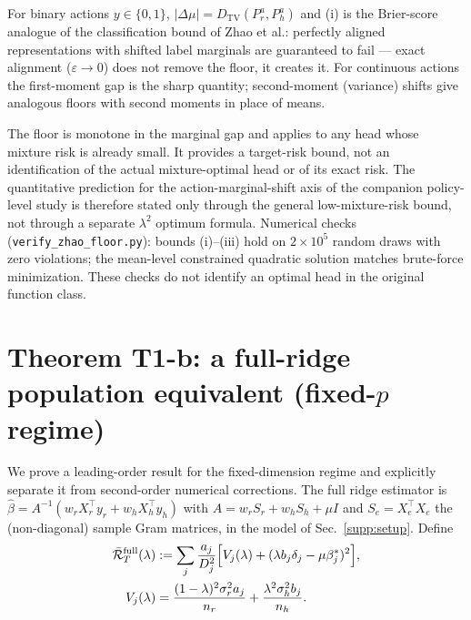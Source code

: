 \begin{remark}
For binary actions $y \in \{0,1\}$, $|\Delta\mu| = D_{\mathrm{TV}}(P_r^a, P_h^a)$ and (i) is the Brier-score analogue of the classification bound of Zhao et al.: perfectly aligned representations with shifted label marginals are guaranteed to fail --- exact alignment ($\varepsilon \to 0$) does not remove the floor, it creates it.
For continuous actions the first-moment gap is the sharp quantity; second-moment (variance) shifts give analogous floors with second moments in place of means.
\end{remark}

\begin{remark}
The floor is monotone in the marginal gap and applies to any head whose mixture risk is already small. It provides a target-risk bound, not an identification of the actual mixture-optimal head or of its exact risk.
The quantitative prediction for the action-marginal-shift axis of the companion policy-level study is therefore stated only through the general low-mixture-risk bound, not through a separate $\lambda^2$ optimum formula.
Numerical checks (\texttt{verify\_zhao\_floor.py}): bounds (i)--(iii) hold on $2\times10^5$ random draws with zero violations; the mean-level constrained quadratic solution matches brute-force minimization. These checks do not identify an optimal head in the original function class.
\end{remark}

\section{Theorem T1-b: a full-ridge population equivalent (fixed-$p$ regime)}
\label{supp:t1b}

We prove a leading-order result for the fixed-dimension regime and explicitly separate it from second-order numerical corrections.
The full ridge estimator is $\hat\beta = A^{-1}(w_r X_r^\top y_r + w_h X_h^\top y_h)$ with $A = w_r S_r + w_h S_h + \mu I$ and $S_e = X_e^\top X_e$ the (non-diagonal) sample Gram matrices, in the model of Sec.~\ref{supp:setup}.
Define
\begin{align}
  \bar{\mathcal{R}}_T^{\mathrm{full}}(\lambda)
  &:= \sum_j \frac{a_j}{D_j^2}\Big[V_j(\lambda)+(\lambda b_j\delta_j-\mu\beta^*_j)^2\Big], \notag\\
  V_j(\lambda)&=\frac{(1-\lambda)^2\sigma_r^2a_j}{n_r}+\frac{\lambda^2\sigma_h^2b_j}{n_h}.
  \label{supp:eq:t1b-pop}
\end{align}

